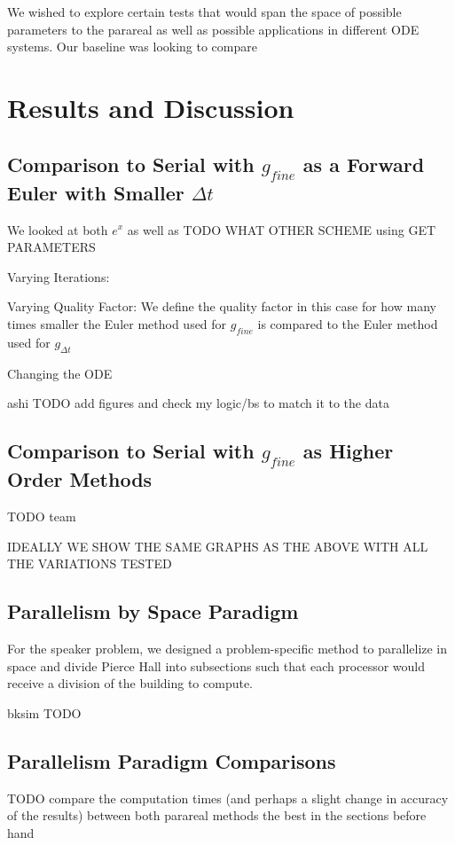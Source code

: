 \documentclass[letterpaper,12pt]{article}
\begin{document}
We wished to explore certain tests that would span the space of possible
parameters to the parareal as well as possible applications in different ODE
systems. Our baseline was looking to compare 

\section{Results and Discussion}

\subsection{Comparison to Serial with $g_{fine}$ as a Forward Euler with
Smaller $\Delta t$}

We looked at both $e^x$ as well as TODO WHAT OTHER SCHEME using GET PARAMETERS

Varying Iterations:

Varying Quality Factor:
We define the quality factor in this case for how many times smaller the Euler method used for $g_{fine}$ is compared to the Euler method used for $g_{\Delta t}$

Changing the ODE

ashi TODO add figures and check my logic/bs to match it to the data

\subsection{Comparison to Serial with $g_{fine}$ as Higher Order Methods}

TODO team

IDEALLY WE SHOW THE SAME GRAPHS AS THE ABOVE WITH ALL THE VARIATIONS TESTED

\subsection{Parallelism by Space Paradigm}

For the speaker problem, we designed a problem-specific method to parallelize in
space and divide Pierce Hall into subsections such that each processor would
receive a division of the building to compute.

bksim TODO

\subsection{Parallelism Paradigm Comparisons}

TODO compare the computation times (and perhaps a slight change in accuracy of
the results) between both parareal methods the best in the sections before hand
\end{document}
